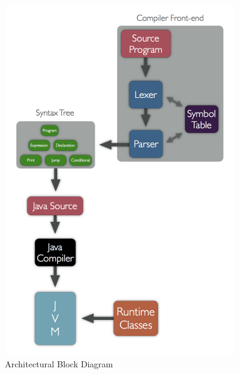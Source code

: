 \documentclass[letterpaper,oneside,12pt, pdftex]{report}
\begin{document}
\begin{figure}[htbp]
  \centering
  \includegraphics{blocks_scaled.png}
  \caption{Architectural Block Diagram}
  \label{blockdiagram}
\end{figure}
\end{document}

